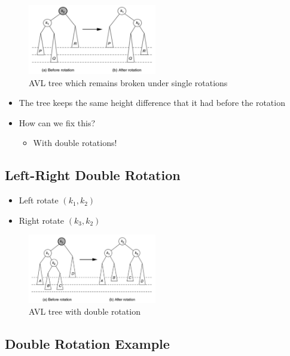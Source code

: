 \documentclass[
  10pt,
  english,
  letterpaper,
,tablecaptionabove
]{scrartcl}
\providecommand{\tightlist}{%
  \setlength{\itemsep}{0pt}\setlength{\parskip}{0pt}}
\begin{document}
\begin{figure}
\centering
\includegraphics[width=0.5\textwidth,height=\textheight]{images/10.png}
\caption{AVL tree which remains broken under single rotations}
\end{figure}

\begin{itemize}
\tightlist
\item
  The tree keeps the same height difference that it had before the
  rotation
\item
  How can we fix this?

  \begin{itemize}
  \tightlist
  \item
    With double rotations!
  \end{itemize}
\end{itemize}

\hypertarget{left-right-double-rotation}{%
\subsection{Left-Right Double
Rotation}\label{left-right-double-rotation}}

\begin{itemize}
\tightlist
\item
  Left rotate \((k_1, k_2)\)
\item
  Right rotate \((k_3, k_2)\)
\end{itemize}

\begin{figure}
\centering
\includegraphics[width=0.5\textwidth,height=\textheight]{images/11.png}
\caption{AVL tree with double rotation}
\end{figure}

\hypertarget{double-rotation-example}{%
\subsection{Double Rotation Example}\label{double-rotation-example}}
\end{document}
